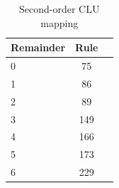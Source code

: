 \documentclass{article}
\begin{document}
\begin{table}[h!]
  \begin{center}
    \caption{Second-order CLU mapping}
    \label{tab:second-order-clu}
    \begin{tabular}{l|c|r} %
      \textbf{Remainder} & \textbf{Rule}\\
      \hline
      0 & 75\\
      1 & 86\\
      2 & 89\\
      3 & 149\\
      4 & 166\\
      5 & 173\\
      6 & 229\\
    \end{tabular}
  \end{center}
\end{table}
\end{document}
